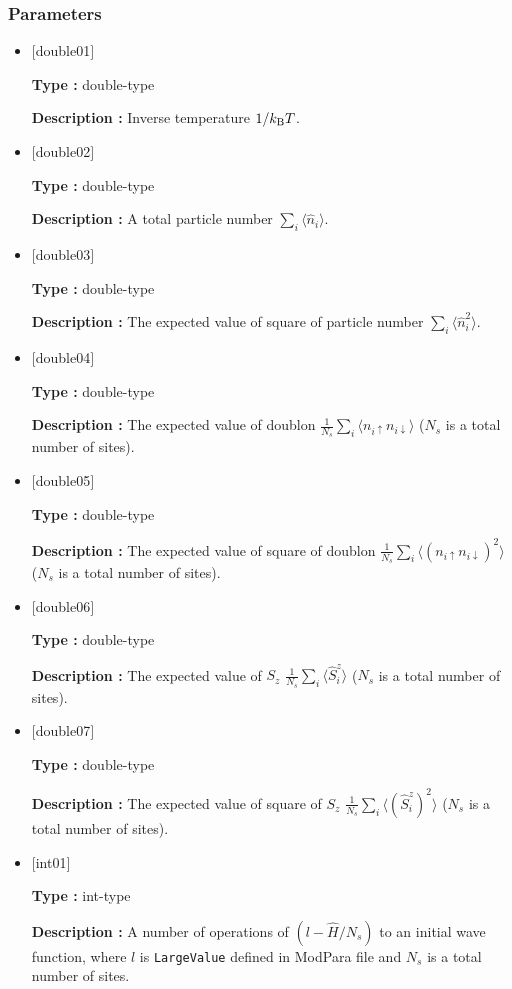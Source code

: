 \subsubsection{Parameters}
 \begin{itemize}

  \item  $[$double01$]$
  
 {\bf Type :} double-type

{\bf Description :} Inverse temperature $1/{k_{\rm B}T}$.
 
  \item $[$double02$]$

 {\bf Type :} double-type 

{\bf Description :}  A total particle number $\sum_{i} \langle \hat{n}_i \rangle$.

  \item $[$double03$]$

 {\bf Type :} double-type 

{\bf Description :} The expected value of square of particle number $\sum_{i} \langle \hat{n}_i^2 \rangle$.

  \item $[$double04$]$

 {\bf Type :} double-type 

{\bf Description :} The expected value of doublon $\frac{1}{N_s} \sum_{i}\langle n_{i\uparrow}n_{i\downarrow}\rangle$ ($N_s$ is a total number of sites).

  \item $[$double05$]$

 {\bf Type :} double-type 

{\bf Description :} The expected value of square of doublon 
$\frac{1}{N_s} \sum_{i}\langle (n_{i\uparrow} n_{i\downarrow})^2\rangle$ ($N_s$ is a total number of sites).

  \item $[$double06$]$

 {\bf Type :} double-type 

{\bf Description :} The expected value of $S_z$
$\frac{1}{N_s} \sum_{i}\langle \hat{S}_i^z\rangle$ ($N_s$ is a total number of sites).

  \item $[$double07$]$

 {\bf Type :} double-type 

{\bf Description :}  The expected value of square of $S_z$
$\frac{1}{N_s} \sum_{i}\langle (\hat{S}_i^z)^2\rangle$ ($N_s$ is a total number of sites).

 \item $[$int01$]$

 {\bf Type :} int-type 

{\bf Description :} A number of operations of $(l-\hat{H}/N_{s})$ to an initial wave function, where $l$ is \verb|LargeValue| defined in ModPara file and $N_{s}$ is a total number of sites.

 \end{itemize}



